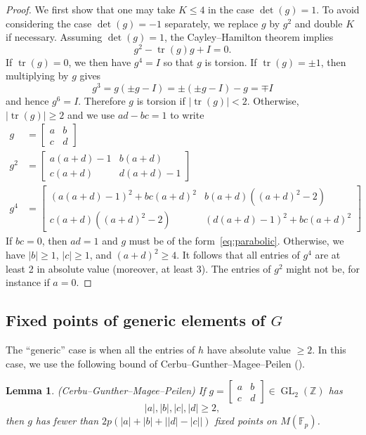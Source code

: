 \documentclass[10pt]{amsart}
\newtheorem{lemm}[theo]{Lemma}\newtheorem{prop}[theo]{Proposition}\newtheorem{coro}[theo]{Corollary}\newtheorem{conj}[theo]{Conjecture}
\theoremstyle{definition}\newtheorem{defi}[theo]{Definition}\newtheorem{rema}[theo]{Remark}\newtheorem{exam}[theo]{Example}\newtheorem{exem}[theo]{Example}\newtheorem{nota}[theo]{Notation}
\newcommand{\Z}{\mathbb{Z}}
\newcommand{\F}{\mathbb{F}}
\DeclareMathOperator{\tr}{tr}
\DeclareMathOperator{\GL}{GL}
\begin{document}
\begin{proof}
We first show that one may take $K \leq 4$ in the case $\det(g) = 1$. To avoid considering the case $\det(g)=-1$ separately, we replace $g$ by $g^2$ and double $K$ if necessary. Assuming $\det(g)=1$, the Cayley--Hamilton theorem implies
\[
g^2 - \tr(g)g + I = 0.
\]
If $\tr(g) = 0$, we then have $g^4 = I$ so that $g$ is torsion. If $\tr(g) = \pm 1$, then multiplying by $g$ gives
\[
g^3 = g(\pm g - I) = \pm (\pm g - I) - g = \mp I
\]
and hence $g^6 = I$. Therefore $g$ is torsion if $| \tr(g)| < 2$. Otherwise, $|\tr(g)| \geq 2$ and we use $ad-bc = 1$ to write
\begin{align*}
g &=
\begin{bmatrix} a & b \\ c & d
\end{bmatrix} \\
g^2 &=
\begin{bmatrix} a(a+d)-1 & b(a+d) \\ c(a+d) & d(a+d)-1
\end{bmatrix} \\
g^4 &=
\begin{bmatrix} (a(a+d)-1)^2 + bc(a+d)^2 & b(a+d)((a+d)^2 - 2) \\ c(a+d)((a+d)^2 -2) & (d(a+d)-1)^2 + bc(a+d)^2
\end{bmatrix}
\end{align*}
If $bc=0$, then $ad=1$ and $g$ must be of the form~\eqref{eq:parabolic}. Otherwise, we have $|b|\geq 1$, $|c| \geq 1$, and $(a+d)^2 \geq 4$. It follows that all entries of $g^4$ are at least 2 in absolute value (moreover, at least 3). The entries of $g^2$ might not be, for instance if $a=0$.
\end{proof}


\subsection{Fixed points of generic elements of \texorpdfstring{$G$}{G}}
The ``generic'' case is when all the entries of $h$ have absolute value $\geq2$. In this case, we use the following bound of Cerbu--Gunther--Magee--Peilen (\cite[Lemma~3.9]{CGMP}).

\begin{lemm}\label{lem:cgmp}(Cerbu--Gunther--Magee--Peilen)
If $g=\left[
\begin{smallmatrix}a & b\\
c & d
\end{smallmatrix}\right]\in\GL_{2}(\Z)$ has
\[
|a|,|b|,|c|,|d| \geq 2,
\]
then $g$ has fewer than $2p(|a|+|b|+\big||d|-|c||)$ fixed points on $M(\F_{p})$.
\end{lemm}
\end{document}

